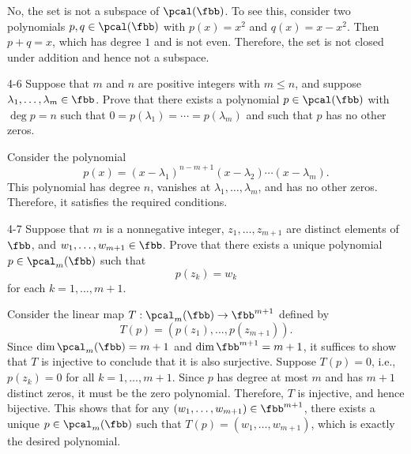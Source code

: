 \begin{sol}
    No, the set is not a subspace of $\pcal(\fbb)$.
	To see this, consider two polynomials $p, q \in \pcal(\fbb)$ with $p(x) = x^2$ and $q(x) = x - x^2$.
	Then $p + q = x$, which has degree $1$ and is not even.
	Therefore, the set is not closed under addition and hence not a subspace.
\end{sol}

\begin{exercise}{4-6}
    Suppose that $m$ and $n$ are positive integers with $m \leq n$, and suppose $\lambda_1, \ldots, \lambda_m \in \fbb$.
	Prove that there exists a polynomial $p \in \pcal(\fbb)$ with $\deg p = n$ such that $0 = p(\lambda_1) = \cdots = p(\lambda_m)$ and such that $p$ has no other zeros.
\end{exercise}

\begin{sol}
    Consider the polynomial
    \[
    	p(x) = (x - \lambda_1)^{n - m + 1}(x - \lambda_2) \cdots (x - \lambda_m).
    \]
    This polynomial has degree $n$, vanishes at $\lambda_1, \ldots, \lambda_m$, and has no other zeros.
	Therefore, it satisfies the required conditions.
\end{sol}

\begin{exercise}{4-7}
    Suppose that $m$ is a nonnegative integer, $z_1, \ldots, z_{m + 1}$ are distinct elements of $\fbb$, and $w_1, \ldots, w_{m + 1} \in \fbb$.
	Prove that there exists a unique polynomial $p \in \pcal_m(\fbb)$ such that
    \[
    	p(z_k) = w_k
    \]
    for each $k = 1, \ldots, m + 1$.
    
\end{exercise}

\begin{sol}
    Consider the linear map $T: \pcal_m(\fbb) \to \fbb^{m + 1}$ defined by
    \[
    	T(p) = (p(z_1), \ldots, p(z_{m + 1})).
    \]
    Since $\dim \pcal_m(\fbb) = m + 1$ and $\dim \fbb^{m + 1} = m + 1$, it suffices to show that $T$ is injective to conclude that it is also surjective.
	Suppose $T(p) = 0$, i.e., $p(z_k) = 0$ for all $k = 1, \ldots, m + 1$.
	Since $p$ has degree at most $m$ and has $m + 1$ distinct zeros, it must be the zero polynomial.
	Therefore, $T$ is injective, and hence bijective.
	This shows that for any $(w_1, \ldots, w_{m + 1}) \in \fbb^{m + 1}$, there exists a unique $p \in \pcal_m(\fbb)$ such that $T(p) = (w_1, \ldots, w_{m + 1})$, which is exactly the desired polynomial.
\end{sol}

